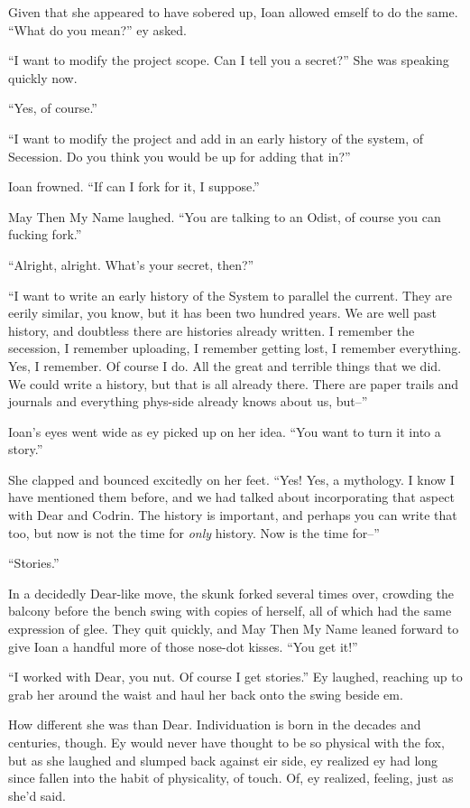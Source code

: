 Given that she appeared to have sobered up, Ioan allowed emself to do the same. ``What do you mean?'' ey asked.

``I want to modify the project scope. Can I tell you a secret?'' She was speaking quickly now.

``Yes, of course.''

``I want to modify the project and add in an early history of the system, of Secession. Do you think you would be up for adding that in?''

Ioan frowned. ``If can I fork for it, I suppose.''

May Then My Name laughed. ``You are talking to an Odist, of course you can fucking fork.''

``Alright, alright. What's your secret, then?''

``I want to write an early history of the System to parallel the current. They are eerily similar, you know, but it has been two hundred years. We are well past history, and doubtless there are histories already written. I remember the secession, I remember uploading, I remember getting lost, I remember everything. Yes, I remember. Of course I do. All the great and terrible things that we did. We could write a history, but that is all already there. There are paper trails and journals and everything phys-side already knows about us, but--''

Ioan's eyes went wide as ey picked up on her idea. ``You want to turn it into a story.''

She clapped and bounced excitedly on her feet. ``Yes! Yes, a mythology. I know I have mentioned them before, and we had talked about incorporating that aspect with Dear and Codrin. The history is important, and perhaps you can write that too, but now is not the time for \emph{only} history. Now is the time for--''

``Stories.''

In a decidedly Dear-like move, the skunk forked several times over, crowding the balcony before the bench swing with copies of herself, all of which had the same expression of glee. They quit quickly, and May Then My Name leaned forward to give Ioan a handful more of those nose-dot kisses. ``You get it!''

``I worked with Dear, you nut. Of course I get stories.'' Ey laughed, reaching up to grab her around the waist and haul her back onto the swing beside em.

How different she was than Dear. Individuation is born in the decades and centuries, though. Ey would never have thought to be so physical with the fox, but as she laughed and slumped back against eir side, ey realized ey had long since fallen into the habit of physicality, of touch. Of, ey realized, feeling, just as she'd said.

